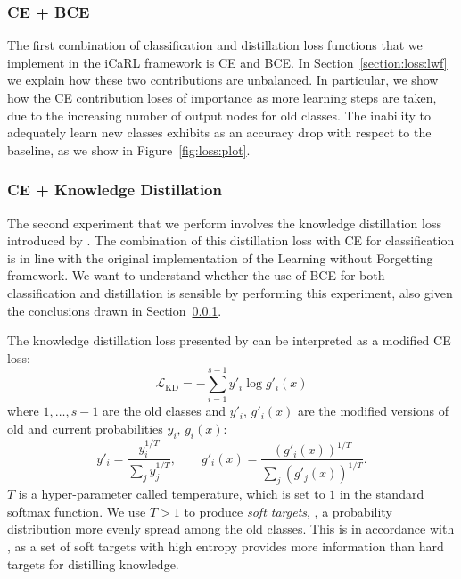 \documentclass[10pt,twocolumn,letterpaper]{article}
\begin{document}
\subsubsection{CE + BCE}
\label{section:loss:cebce}
The first combination of classification and distillation loss functions that we implement in the iCaRL framework is CE and BCE. In Section~\ref{section:loss:lwf} we explain how these two contributions are unbalanced. In particular, we show how the CE contribution loses of importance as more learning steps are taken, due to the increasing number of output nodes for old classes. The inability to adequately learn new classes exhibits as an accuracy drop with respect to the baseline, as we show in Figure~\ref{fig:loss:plot}.

\subsubsection{CE + Knowledge Distillation}
The second experiment that we perform involves the knowledge distillation loss introduced by \cite{hinton:2015}. The combination of this distillation loss with CE for classification is in line with the original implementation of the Learning without Forgetting framework. We want to understand whether the use of BCE for both classification and distillation is sensible by performing this experiment, also given the conclusions drawn in Section~\ref{section:loss:cebce}.

The knowledge distillation loss presented by \cite{hinton:2015} can be interpreted as a modified CE loss:
\begin{equation}
    \mathcal{L}_{\text{KD}}=-\sum_{i=1}^{s-1} y'_i \log g'_i(x) \label{eq:loss:cebce}
\end{equation}
where $1,\dots,s-1$ are the old classes and $y'_i,\, g'_i(x)$ are the modified versions of old and current probabilities $y_i,\, g_i(x)$:
\begin{equation}
    y'_i = \frac{y_i^{1/T}}{\sum_j y_j^{1/T}}, \qquad g'_i(x) = \frac{(g'_i(x))^{1/T}}{\sum_j (g'_j(x))^{1/T}}. \label{eq:loss:cebce2}
\end{equation}
$T$ is a hyper-parameter called temperature, which is set to $1$ in the standard softmax function. We use $T > 1$ to produce \emph{soft targets}, \ie, a probability distribution more evenly spread among the old classes. This is in accordance with \cite{hinton:2015}, as a set of soft targets with high entropy provides more information than hard targets for distilling knowledge.
\end{document}
